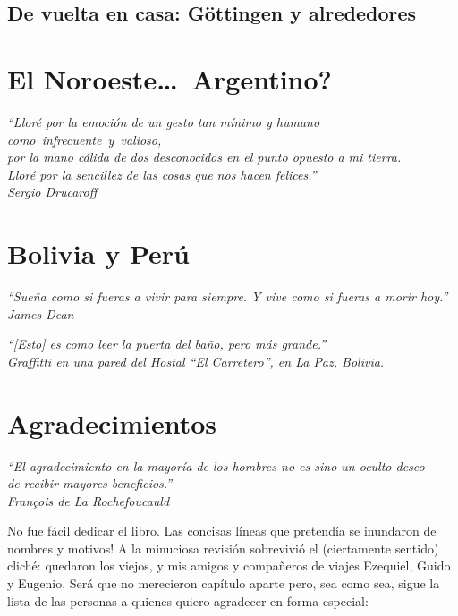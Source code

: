 \documentclass[11pt]{book}
\begin{document}
\section{De vuelta en casa: G\"ottingen y alrededores}


\chapter{El Noroeste\ldots\ \textquestiondown Argentino?}
\begin{flushright}
\item \emph{\small
``Llor\'e por la emoci\'on de un gesto tan m\'inimo y humano
como~infrecuente~y~valioso,\\ por la mano c\'alida de dos desconocidos en el
punto opuesto a mi tierra.\\ Llor\'e por la sencillez de las cosas que nos
hacen felices.''\\
Sergio Drucaroff}
\end{flushright}


\chapter{Bolivia y Per\'u}
\begin{flushright}
\item \emph{\small ``Sue\~na como si fueras a vivir para siempre. Y vive como
si fueras a morir hoy.''\\
James Dean}
\item \emph{\small ``[Esto] es como leer la puerta del ba\~no, pero m\'as
grande.''\\
Graffitti en una pared del Hostal ``El Carretero'', en La Paz, Bolivia.}
\end{flushright}



\backmatter
\chapter{Agradecimientos}
\begin{flushright}
\item \emph{\small ``El agradecimiento en la mayor\'ia de los hombres no es
sino un oculto deseo\\de recibir mayores beneficios.''\\
Fran\c{c}ois de La Rochefoucauld}
\end{flushright}

No fue f\'acil dedicar el libro. \textexclamdown Las concisas l\'ineas que
pretend\'ia se inundaron de nombres y motivos! A la minuciosa revisi\'on
sobrevivi\'o el (ciertamente sentido) clich\'e: quedaron los viejos, y mis
amigos y compa\~neros de viajes Ezequiel, Guido y Eugenio. Ser\'a que no
merecieron cap\'itulo aparte pero, sea como sea, sigue la lista de las
personas a quienes quiero agradecer en forma especial:
\end{document}
